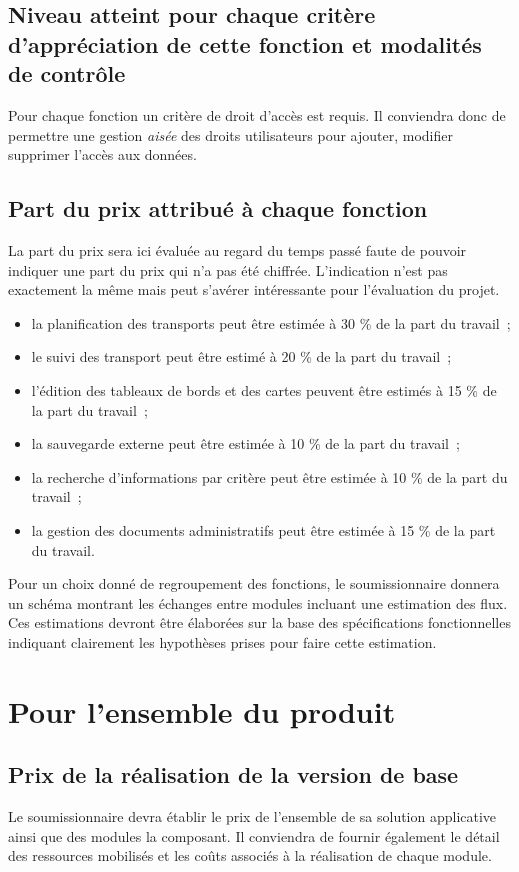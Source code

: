 \subsection{Niveau atteint pour chaque critère d'appréciation de cette fonction et modalités de contrôle}
Pour chaque fonction un critère de droit d'accès est requis. Il conviendra donc de permettre une gestion \emph{aisée} des droits utilisateurs pour ajouter, modifier supprimer l'accès aux données.

\subsection{Part du prix attribué à chaque fonction}
La part du prix sera ici évaluée au regard du temps passé faute de pouvoir indiquer une part du prix qui n'a pas été chiffrée. L'indication n'est pas exactement la même mais peut s'avérer intéressante pour l'évaluation du projet. 
\begin{itemize}
	\item la planification des transports peut être estimée à 30 \% de la part du travail~;
	\item le suivi des transport peut être estimé à 20 \% de la part du travail~;
	\item l'édition des tableaux de bords et des cartes peuvent être estimés à 15 \% de la part du travail~;
	\item la sauvegarde externe peut être estimée à 10 \% de la part du travail~;
	\item la recherche d'informations par critère peut être estimée à 10 \% de la part du travail~;
	\item la gestion des documents administratifs peut être estimée à 15 \% de la part du travail.
\end{itemize}
Pour un choix donné de regroupement des fonctions, le soumissionnaire donnera un schéma montrant les échanges entre modules incluant une estimation des flux. Ces estimations devront être élaborées sur la base des spécifications fonctionnelles indiquant clairement les hypothèses prises pour faire cette estimation. 

\section{Pour l'ensemble du produit}

\subsection{Prix de la réalisation de la version de base}
Le soumissionnaire devra établir le prix de l'ensemble de sa solution applicative ainsi que des modules la composant. Il conviendra de fournir également le détail des ressources mobilisés et les coûts associés à la réalisation de chaque module. 

